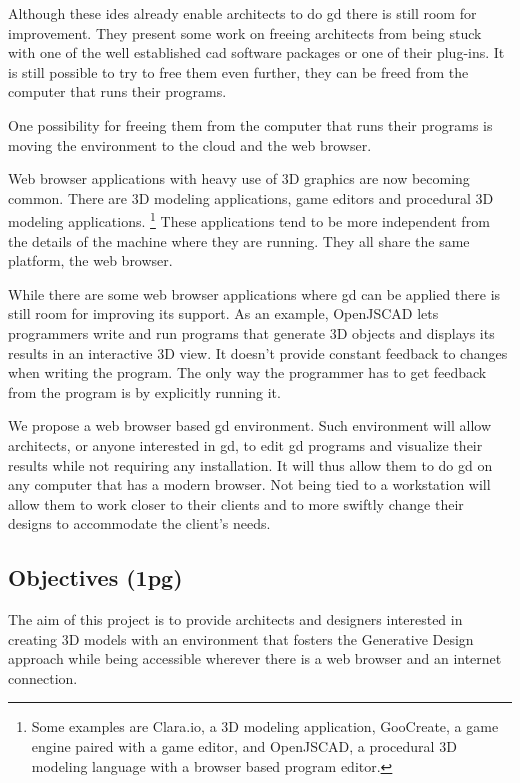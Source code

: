 \documentclass{./llncs2e/llncs}
\begin{document}
	Although these \ac{ide}s already enable architects to do \ac{gd} there is still room for improvement.
	They present some work on freeing architects from being stuck with one of the well established \ac{cad} software packages or one of their plug-ins.
	It is still possible to try to free them even further, they can be freed from the computer that runs their programs.

	One possibility for freeing them from the computer that runs their programs is moving the environment to the cloud and the web browser.


	Web browser applications with heavy use of 3D graphics are now becoming common.
	There are 3D modeling applications, game editors and procedural 3D modeling applications.
	\footnote{Some examples are Clara.io, a 3D modeling application, GooCreate, a game engine paired with a game editor, and OpenJSCAD, a procedural 3D modeling language with a browser based program editor.}
	These applications tend to be more independent from the details of the machine where they are running.
	They all share the same platform, the web browser.

	While there are some web browser applications where \ac{gd} can be applied there is still room for improving its support.
	As an example, OpenJSCAD lets programmers write and run programs that generate 3D objects and displays its results in an interactive 3D view.
	It doesn't provide constant feedback to changes when writing the program.
	The only way the programmer has to get feedback from the program is by explicitly running it.

	We propose a web browser based \ac{gd} environment. 
	Such environment will allow architects, or anyone interested in \ac{gd}, to edit \ac{gd} programs and visualize their results while not requiring any installation. 
	It will thus allow them to do \ac{gd} on any computer that has a modern browser. 
	Not being tied to a workstation will allow them to work closer to their clients and to more swiftly change their designs to accommodate the client's needs.

\subsection{Objectives (1pg)}
	The aim of this project is to provide architects and designers interested in creating 3D models with an environment that fosters the Generative Design approach while being accessible wherever there is a web browser and an internet connection.
\end{document}
